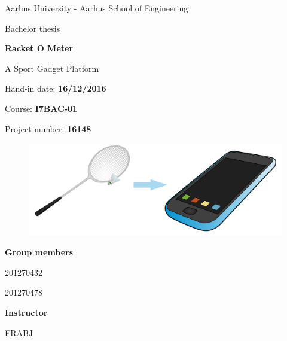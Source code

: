 \begin{titlingpage}

\centering 

Aarhus University - Aarhus School of Engineering

\vspace{0.6cm}

{\huge Bachelor thesis}

\vspace{1cm}

{\Huge \textbf{Racket O Meter}}

{\LARGE A Sport Gadget Platform}
\vspace{0.6cm}

Hand-in date: \textbf{16/12/2016}

Course: \textbf{I7BAC-01}

Project number: \textbf{16148}
\vspace{1.8cm}

\begin{figure}[H] \centering
        \includegraphics[width=1\textwidth]{graphics/FrontpPic_v3}
    \end{figure}

\vspace{1.2cm}

\textbf{Group members}

\signature{Bjørn Sørensen}{201270432}
\signature{Jesper Christensen}{201270478}

\vspace{0.5cm}

\textbf{Instructor}
\signature{Frank Bodholdt Jakobsen}{FRABJ}

\end{titlingpage}

